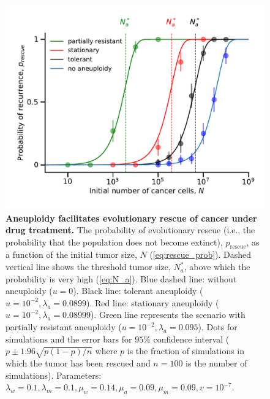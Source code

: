 \documentclass[12pt]{extarticle}
\newcommand{\presc}{p_\text{rescue}}
\begin{document}
\begin{figure}
\includegraphics[width=1\textwidth]{Figures/ProbvNPlot.pdf}
\caption{\textbf{Aneuploidy facilitates evolutionary rescue of cancer under drug treatment.}
The probability of evolutionary rescue (i.e., the probability that the population does not become extinct), $\presc$, as a function of the initial tumor size, $N$ (\cref{eq:rescue_prob}). Dashed vertical line shows the threshold tumor size, $N_a^*$, above which the probability is very high (\cref{eq:N_a}). Blue dashed line: without aneuploidy ($u=0$). Black line: tolerant aneuploidy ($u=10^{-2}, \lambda_a=0.0899$). Red line: stationary aneuploidy ($u=10^{-2}, \lambda_a=0.08999$). Green line represents the scenario with partially resistant aneuploidy ($u=10^{-2}, \lambda_a=0.095$). Dots for simulations and the error bars for $95\%$ confidence interval ($p\pm1.96\sqrt{p\left(1-p\right)/n}$ where $p$ is the fraction of simulations in which the tumor has been rescued and $n=100$ is the number of simulations). Parameters: $\lambda_w=0.1,\lambda_m=0.1,\mu_w=0.14,\mu_a=0.09,\mu_m=0.09, v=10^{-7}$.}
\label{rescue_prob}
\end{figure}
\end{document}
